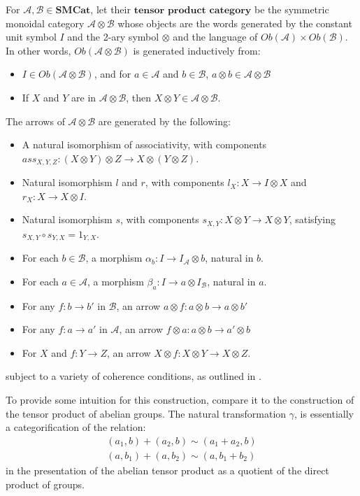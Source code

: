 \begin{defn}\label{smcatmon}
  For $\mathcal{A}, \mathcal{B} \in \mathbf{SMCat}$, let their $\textbf{tensor product category}$ be the symmetric monoidal category $\mathcal{A} \otimes \mathcal{B}$ whose objects are the words generated by the constant unit symbol $I$ and the 2-ary symbol $\otimes$ and the language of $Ob(\mathcal{A}) \times Ob(\mathcal{B})$. In other words, $Ob(\mathcal{A} \otimes \mathcal{B})$ is generated inductively from:
  \begin{itemize}
  \item $I \in Ob(\mathcal{A} \otimes \mathcal{B})$, and for $a \in \mathcal{A}$ and $b \in \mathcal{B}$, $a \otimes b \in \mathcal{A}\otimes\mathcal{B}$
  \item If $X$ and $Y$ are in $\mathcal{A} \otimes \mathcal{B}$, then $X \otimes Y \in \mathcal{A} \otimes \mathcal{B}$.
  \end{itemize}
  The arrows of $\mathcal{A} \otimes \mathcal{B}$ are generated by the following:
  \begin{itemize}
  \item A natural isomorphism of associativity, with components $ass_{X, Y, Z} : (X \otimes Y) \otimes Z \to X \otimes (Y \otimes Z)$.
  \item Natural isomorphism $l$ and $r$, with components $l_X : X \to I \otimes X$ and $r_X : X \to X \otimes I$.
  \item Natural isomorphism $s$, with components $s_{X, Y} : X \otimes Y \to X \otimes Y$, satisfying $s_{X, Y} \circ s_{Y, X} = 1_{Y, X}$.
  \item For each $b \in \mathcal{B}$, a morphism $\alpha_b : I \to I_{\mathcal{A}} \otimes b$, natural in $b$.
  \item For each $a \in \mathcal{A}$, a morphism $\beta_a : I \to a \otimes I_{\mathcal{B}}$, natural in $a$.
  \item For any $f : b \to b'$ in $\mathcal{B}$, an arrow $a \otimes f : a \otimes b \to a \otimes b'$
  \item For any $f : a \to a'$ in $\mathcal{A}$, an arrow $f \otimes a : a \otimes b \to a' \otimes b$
  \item For $X$ and $f : Y \to Z$, an arrow $X \otimes f : X \otimes Y \to X \otimes Z$.
  \end{itemize}
  subject to a variety of coherence conditions, as outlined in \cite{smcat}.
\end{defn}
To provide some intuition for this construction, compare it to the construction of the tensor product of abelian groups. The natural transformation $\gamma$, is essentially a categorification of the relation:
\[
  \begin{split}
    (a_1,b)+(a_2,b) \sim (a_1+a_2,b) \\
    (a,b_1)+(a,b_2) \sim (a,b_1+b_2)
  \end{split}
\]
in the presentation of the abelian tensor product as a quotient of the direct product of groups.


